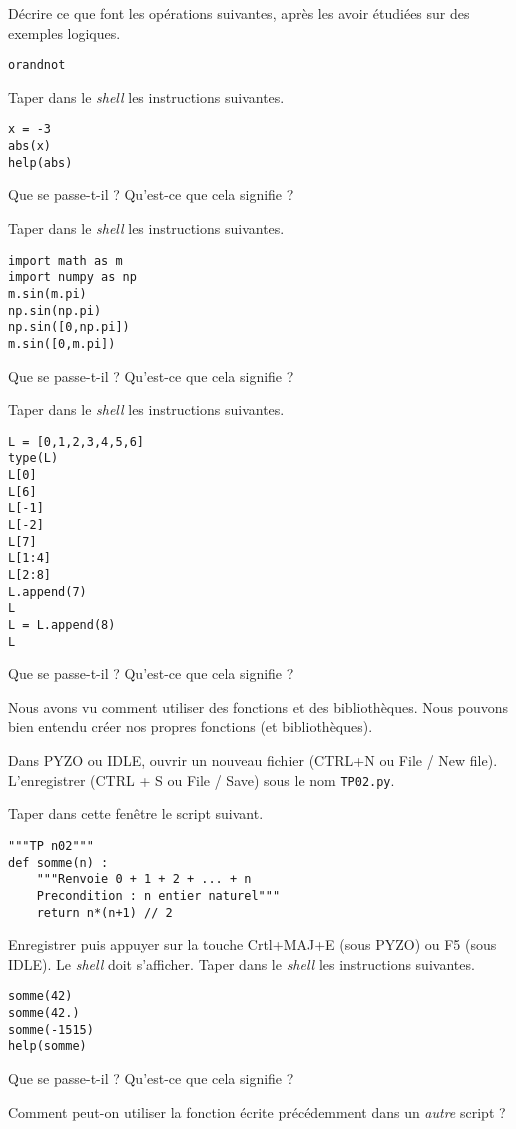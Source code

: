 \medskip{}

\question{} Décrire ce que font les opérations suivantes, après les avoir étudiées sur des exemples logiques.
\begin{center}
  \texttt{or}\qquad\texttt{and}\qquad\texttt{not}
\end{center}


\medskip{}

\question{} Taper dans le \emph{shell} les instructions suivantes. 
\begin{verbatim}
x = -3
abs(x)
help(abs)
\end{verbatim}
Que se passe-t-il ? Qu'est-ce que cela signifie ?

\medskip{}

\question{} Taper dans le \emph{shell} les instructions suivantes. 
\begin{verbatim}
import math as m
import numpy as np
m.sin(m.pi)
np.sin(np.pi)
np.sin([0,np.pi])
m.sin([0,m.pi])
\end{verbatim}
Que se passe-t-il ? Qu'est-ce que cela signifie ?


\medskip{}

\question{} Taper dans le \emph{shell} les instructions suivantes. 
\begin{verbatim}
L = [0,1,2,3,4,5,6]
type(L)
L[0]
L[6]
L[-1]
L[-2]
L[7]
L[1:4]
L[2:8]
L.append(7)
L
L = L.append(8)
L
\end{verbatim}
Que se passe-t-il ? Qu'est-ce que cela signifie ?

\medskip{}

Nous avons vu comment utiliser des fonctions et des bibliothèques. Nous pouvons bien entendu créer nos propres fonctions (et bibliothèques). 

Dans PYZO ou IDLE, ouvrir un nouveau fichier (CTRL+N ou File / New file). L'enregistrer (CTRL + S ou File / Save) sous le nom \texttt{TP02.py}. 

\medskip{}

\question{} Taper dans cette fenêtre le script suivant. 
\begin{lstlisting}
"""TP n02"""
def somme(n) : 
    """Renvoie 0 + 1 + 2 + ... + n
    Precondition : n entier naturel"""
    return n*(n+1) // 2 
\end{lstlisting}
Enregistrer puis appuyer sur la touche Crtl+MAJ+E (sous PYZO) ou F5 (sous IDLE).
Le \emph{shell} doit s'afficher. 
Taper dans le \emph{shell} les instructions suivantes. 
\begin{lstlisting}
somme(42)
somme(42.)
somme(-1515)
help(somme)
\end{lstlisting}
Que se passe-t-il ? Qu'est-ce que cela signifie ?

\medskip{}

\question{} Comment peut-on utiliser la fonction écrite précédemment dans un \emph{autre} script \python{} ? 